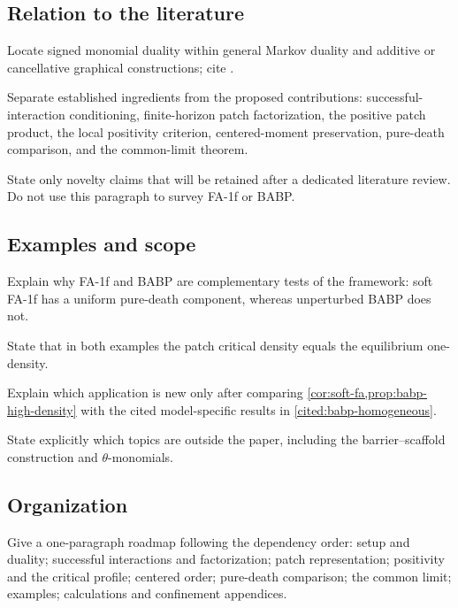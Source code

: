 \subsection{Relation to the literature}

\begin{discussion}
  \item Locate signed monomial duality within general Markov duality and
  additive or cancellative graphical constructions; cite
  \citet{liggett1985,jansen-kurt2014,sudbury-lloyd1995}.
  \item Separate established ingredients from the proposed
  contributions: successful-interaction conditioning, finite-horizon
  patch factorization, the positive patch product, the local positivity
  criterion, centered-moment preservation, pure-death comparison, and
  the common-limit theorem.
  \item State only novelty claims that will be retained after a dedicated
  literature review. Do not use this paragraph to survey FA-1f or BABP.
\end{discussion}

\subsection{Examples and scope}

\begin{discussion}
  \item Explain why FA-1f and BABP are complementary tests of the
  framework: soft FA-1f has a uniform pure-death component, whereas
  unperturbed BABP does not.
  \item State that in both examples the patch critical density equals
  the equilibrium one-density.
  \item Explain which application is new only after comparing
  \cref{cor:soft-fa,prop:babp-high-density} with the cited model-specific
  results in \cref{cited:babp-homogeneous}.
  \item State explicitly which topics are outside the paper, including
  the barrier--scaffold construction and \(\theta\)-monomials.
\end{discussion}

\subsection{Organization}

\begin{discussion}
  \item Give a one-paragraph roadmap following the dependency order:
  setup and duality; successful interactions and factorization; patch
  representation; positivity and the critical profile; centered order;
  pure-death comparison; the common limit; examples; calculations and
  confinement appendices.
\end{discussion}
